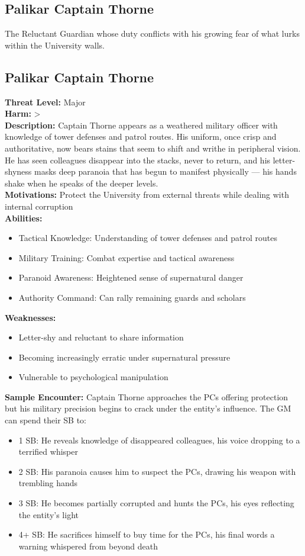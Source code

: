 \documentclass[11pt]{article}
\newenvironment{monsterentry}[1]{%
  \begin{mdframed}[backgroundcolor=shadecolor, linewidth=0pt, leftmargin=0pt, rightmargin=0pt]%
  \subsection*{#1}%
}{%
  \end{mdframed}%
}
\begin{document}
\subsection{Palikar Captain Thorne}

The Reluctant Guardian whose duty conflicts with his growing fear of what lurks within the University walls.

\begin{monsterentry}{Palikar Captain Thorne}
\textbf{Threat Level:} Major \\
\textbf{Harm:} \textgreater \\
\textbf{Description:} Captain Thorne appears as a weathered military officer with knowledge of tower defenses and patrol routes. His uniform, once crisp and authoritative, now bears stains that seem to shift and writhe in peripheral vision. He has seen colleagues disappear into the stacks, never to return, and his letter-shyness masks deep paranoia that has begun to manifest physically — his hands shake when he speaks of the deeper levels. \\
\textbf{Motivations:} Protect the University from external threats while dealing with internal corruption \\
\textbf{Abilities:}
\begin{itemize}
    \item Tactical Knowledge: Understanding of tower defenses and patrol routes
    \item Military Training: Combat expertise and tactical awareness
    \item Paranoid Awareness: Heightened sense of supernatural danger
    \item Authority Command: Can rally remaining guards and scholars
\end{itemize}
\textbf{Weaknesses:}
\begin{itemize}
    \item Letter-shy and reluctant to share information
    \item Becoming increasingly erratic under supernatural pressure
    \item Vulnerable to psychological manipulation
\end{itemize}
\textbf{Sample Encounter:} Captain Thorne approaches the PCs offering protection but his military precision begins to crack under the entity's influence. The GM can spend their SB to:
\begin{itemize}
    \item 1 SB: He reveals knowledge of disappeared colleagues, his voice dropping to a terrified whisper
    \item 2 SB: His paranoia causes him to suspect the PCs, drawing his weapon with trembling hands
    \item 3 SB: He becomes partially corrupted and hunts the PCs, his eyes reflecting the entity's light
    \item 4+ SB: He sacrifices himself to buy time for the PCs, his final words a warning whispered from beyond death
\end{itemize}
\end{monsterentry}
\end{document}
